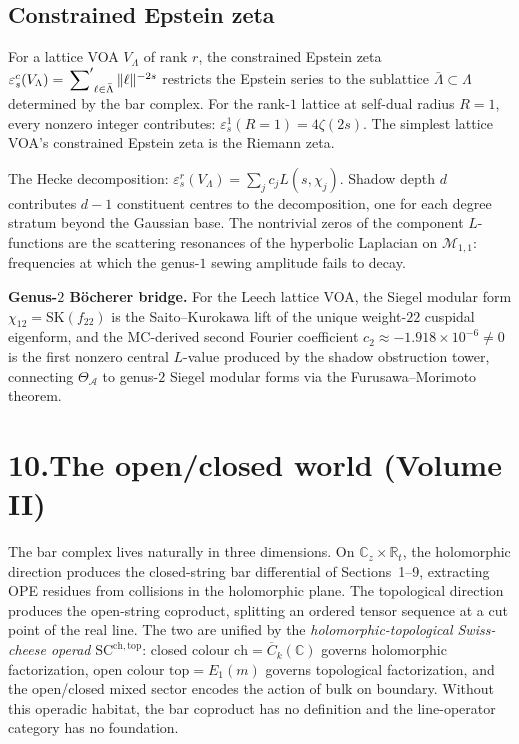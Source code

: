 \documentclass[11pt]{report}
\theoremstyle{definition}
\theoremstyle{remark}
\providecommand{\cA}{\mathcal{A}}
\providecommand{\cM}{\mathcal{M}}
\providecommand{\FM}{\overline{C}}
\providecommand{\SCchtop}{\mathrm{SC}^{\mathrm{ch,top}}}
\providecommand{\bC}{\mathbb{C}}
\providecommand{\bR}{\mathbb{R}}
\numberwithin{equation}{section}
\begin{document}
\subsection*{Constrained Epstein zeta}

For a lattice VOA $V_\Lambda$ of rank $r$, the constrained
Epstein zeta
$\varepsilon^c_s(V_\Lambda) = \sideset{}{'}\sum_{\ell \in
\bar\Lambda}\|\ell\|^{-2s}$
restricts the Epstein series to the sublattice
$\bar\Lambda \subset \Lambda$ determined by the bar complex.
For the rank-$1$ lattice at self-dual radius $R = 1$, every
nonzero integer contributes:
$\varepsilon^1_s(R{=}1) = 4\zeta(2s)$. The simplest lattice
VOA's constrained Epstein zeta is the Riemann zeta.

The Hecke decomposition:
$\varepsilon^r_s(V_\Lambda) = \sum_j c_j L(s, \chi_j)$. Shadow
depth $d$ contributes $d - 1$ constituent centres to the
decomposition, one for each degree stratum beyond
the Gaussian base. The nontrivial zeros of the component
$L$-functions are the scattering resonances of the hyperbolic
Laplacian on $\cM_{1,1}$: frequencies at which the genus-$1$
sewing amplitude fails to decay.

\medskip\noindent\textbf{Genus-$2$ B\"ocherer bridge.}
For the Leech lattice VOA, the Siegel modular form
$\chi_{12} = \mathrm{SK}(f_{22})$ is the Saito--Kurokawa lift
of the unique weight-$22$ cuspidal eigenform, and the
MC-derived second Fourier coefficient $c_2 \approx
-1.918 \times 10^{-6} \neq 0$ is the first nonzero central
$L$-value produced by the shadow obstruction tower,
connecting $\Theta_\cA$ to genus-$2$ Siegel modular forms via
the Furusawa--Morimoto theorem.


\section*{10.\quad The open/closed world (Volume II)}

The bar complex lives naturally in three dimensions. On
$\bC_z \times \bR_t$, the holomorphic direction produces the
closed-string bar differential of Sections~1--9, extracting OPE
residues from collisions in the holomorphic plane. The
topological direction produces the open-string coproduct,
splitting an ordered tensor sequence at a cut point of the real
line. The two are unified by the \emph{holomorphic-topological
Swiss-cheese operad} $\SCchtop$: closed colour
$\mathrm{ch} = \FM_k(\bC)$ governs holomorphic factorization,
open colour $\mathrm{top} = E_1(m)$ governs topological
factorization, and the open/closed mixed sector encodes the
action of bulk on boundary. Without this operadic habitat, the
bar coproduct has no definition and the line-operator category
has no foundation.
\end{document}
